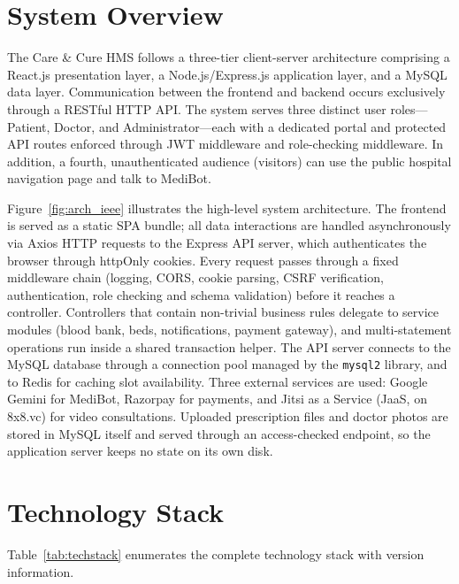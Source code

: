 \FloatBarrier
\section{System Overview}

The Care \& Cure HMS follows a three-tier client-server architecture comprising a React.js presentation layer, a Node.js/Express.js application layer, and a MySQL data layer. Communication between the frontend and backend occurs exclusively through a RESTful HTTP API. The system serves three distinct user roles—Patient, Doctor, and Administrator—each with a dedicated portal and protected API routes enforced through JWT middleware and role-checking middleware. In addition, a fourth, unauthenticated audience (visitors) can use the public hospital navigation page and talk to MediBot.

Figure~\ref{fig:arch_ieee} illustrates the high-level system architecture. The frontend is served as a static SPA bundle; all data interactions are handled asynchronously via Axios HTTP requests to the Express API server, which authenticates the browser through httpOnly cookies. Every request passes through a fixed middleware chain (logging, CORS, cookie parsing, CSRF verification, authentication, role checking and schema validation) before it reaches a controller. Controllers that contain non-trivial business rules delegate to service modules (blood bank, beds, notifications, payment gateway), and multi-statement operations run inside a shared transaction helper. The API server connects to the MySQL database through a connection pool managed by the \texttt{mysql2} library, and to Redis for caching slot availability. Three external services are used: Google Gemini for MediBot, Razorpay for payments, and Jitsi as a Service (JaaS, on 8x8.vc) for video consultations. Uploaded prescription files and doctor photos are stored in MySQL itself and served through an access-checked endpoint, so the application server keeps no state on its own disk.

\FloatBarrier
\section{Technology Stack}

Table~\ref{tab:techstack} enumerates the complete technology stack with version information.

